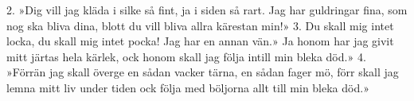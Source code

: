 2.  »Dig vill jag kläda i silke så fint, ja i siden så rart.
    Jag har guldringar fina,
    som nog ska bliva dina,
    blott du vill bliva allra kärestan min!»
3.  Du skall mig intet locka, du skall mig intet pocka! Jag har en annan vän.»
    Ja honom har jag givit
    mitt järtas hela kärlek,
    ock honom skall jag följa intill min bleka död.»
4.  »Förrän jag skall överge en sådan vacker tärna, en sådan fager mö,
    förr skall jag lemna mitt liv under tiden
    ock följa med böljorna allt till min bleka död.»
